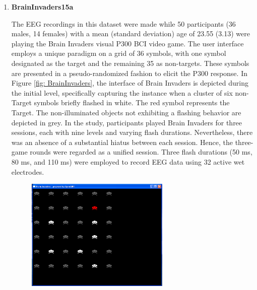 \begin{enumerate}
    \item \textbf{BrainInvaders15a} \cite{bi2015a}
    
The EEG recordings in this dataset were made while 50 participants (36 males, 14 females) with a mean (standard deviation) age of 23.55 (3.13) were playing the Brain Invaders visual P300 BCI video game.
The user interface employs a unique paradigm on a grid of 36 symbols, with one symbol designated as the target and the remaining 35 as non-targets. These symbols are presented in a pseudo-randomized fashion to elicit the P300 response. In Figure \ref{fig: BrainInvaders}, the interface of Brain Invaders is depicted during the initial level, specifically capturing the instance when a cluster of six non-Target symbols briefly flashed in white. The red symbol represents the Target. The non-illuminated objects not exhibiting a flashing behavior are depicted in grey. In the study, participants played Brain Invaders for three sessions, each with nine levels and varying flash durations.
Nevertheless, there was an absence of a substantial hiatus between each session. Hence, the three-game rounds were regarded as a unified session. Three flash durations (50 ms, 80 ms, and 110 ms) were employed to record EEG data using 32 active wet electrodes.




\begin{figure}
    \centering
     \includegraphics[width=0.65\textwidth]{figures/BrainInvaders15a.png}   
    

\end{figure}
\end{enumerate}
